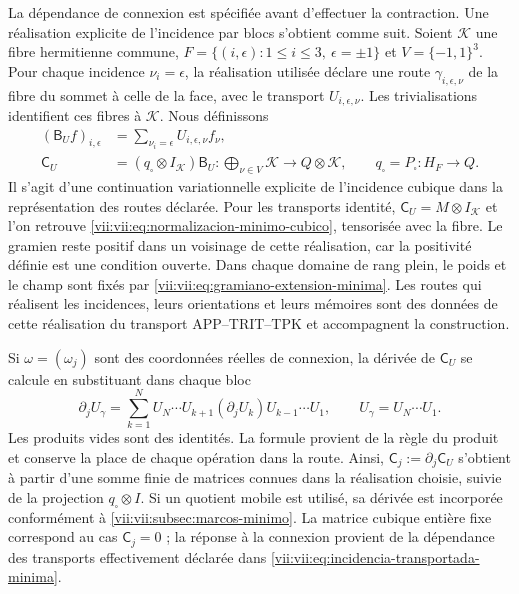 La dépendance de connexion est spécifiée avant d'effectuer la
contraction. Une réalisation explicite de l'incidence par blocs
s'obtient comme suit. Soient \(\mathcal K\) une fibre hermitienne commune,
\(F=\{(i,\epsilon):1\leq i\leq3,\ \epsilon=\pm1\}\) et
\(V=\{-1,1\}^3\). Pour chaque incidence \(\nu_i=\epsilon\),
la réalisation utilisée déclare une route \(\gamma_{i,\epsilon,\nu}\)
de la fibre du sommet à celle de la face, avec le transport
\(U_{i,\epsilon,\nu}\). Les trivialisations identifient ces fibres
à \(\mathcal K\). Nous définissons
\begin{equation}
 \begin{split}
 (\mathsf B_Uf)_{i,\epsilon}
   &=\sum_{\nu_i=\epsilon}U_{i,\epsilon,\nu}f_\nu,\\
 \mathsf C_U&=(q_\square\otimes I_{\mathcal K})\mathsf B_U:
   \bigoplus_{\nu\in V}\mathcal K\longrightarrow Q\otimes\mathcal K,
 \qquad q_\square=P_\square:H_F\to Q.
 \end{split}
 \label{vii:vii:eq:incidencia-transportada-minima}
\end{equation}
Il s'agit d'une continuation variationnelle explicite de l'incidence cubique
dans la représentation des routes déclarée. Pour les transports identité,
\(\mathsf C_U=M\otimes I_{\mathcal K}\) et l'on retrouve
\eqref{vii:vii:eq:normalizacion-minimo-cubico}, tensorisée avec la fibre.
Le gramien reste positif dans un voisinage de cette réalisation,
car la positivité définie est une condition ouverte. Dans chaque domaine
de rang plein, le poids et le champ sont fixés par
\eqref{vii:vii:eq:gramiano-extension-minima}. Les routes qui réalisent les
incidences, leurs orientations et leurs mémoires sont des données de cette
réalisation du transport APP--TRIT--TPK et accompagnent la construction.

Si \(\omega=(\omega_j)\) sont des coordonnées réelles de connexion, la dérivée de \(\mathsf C_U\) se calcule en substituant dans chaque bloc
\begin{equation}
 \partial_j U_\gamma
 =\sum_{k=1}^{N}
    U_N\cdots U_{k+1}(\partial_jU_k)U_{k-1}\cdots U_1,
 \qquad U_\gamma=U_N\cdots U_1.
 \label{vii:vii:eq:derivada-incidencia-rutas}
\end{equation}
Les produits vides sont des identités. La formule provient de la règle du produit et conserve la place de chaque opération dans la route. Ainsi, \(\mathsf C_j:=\partial_j\mathsf C_U\) s'obtient à partir d'une somme finie de matrices connues dans la réalisation choisie, suivie de la projection \(q_\square\otimes I\). Si un quotient mobile est utilisé, sa dérivée est incorporée conformément à \ref{vii:vii:subsec:marcos-minimo}. La matrice cubique entière fixe correspond au cas \(\mathsf C_j=0\) ; la réponse à la connexion provient de la dépendance des transports effectivement déclarée dans \eqref{vii:vii:eq:incidencia-transportada-minima}.


